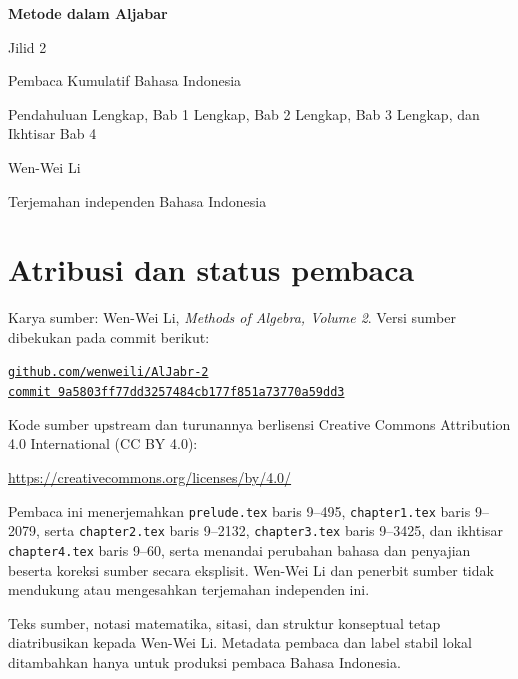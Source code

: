 \documentclass[
  colors=true,
  fontsetup=font-setup-id.tex,
  titlesetup=titles-setup.tex
]{AJbook2}
\theoremstyle{plain}
\theoremstyle{nonumberplain}
\numberwithin{equation}{section}
\numberwithin{figure}{section}
\begin{document}
\begin{titlepage}
  \centering
  \vspace*{0.16\textheight}
  {\Huge\bfseries Metode dalam Aljabar\par}
  \vspace{0.8em}
  {\LARGE Jilid 2\par}
  \vspace{1.8em}
  {\Large Pembaca Kumulatif Bahasa Indonesia\par}
  \vspace{0.6em}
  {\large Pendahuluan Lengkap, Bab 1 Lengkap, Bab 2 Lengkap, Bab 3 Lengkap, dan Ikhtisar Bab 4\par}
  \vfill
  {\Large Wen-Wei Li\par}
  \vspace{0.6em}
  {\normalsize Terjemahan independen Bahasa Indonesia\par}
  \vspace*{0.10\textheight}
\end{titlepage}

\cleardoublepage
\thispagestyle{empty}
\section*{Atribusi dan status pembaca}
Karya sumber: Wen-Wei Li, \emph{Methods of Algebra, Volume 2}. Versi
sumber dibekukan pada commit berikut:
\begin{center}
  \small
  \href{https://github.com/wenweili/AlJabr-2}{\texttt{github.com/wenweili/AlJabr-2}}\\
  \href{https://github.com/wenweili/AlJabr-2/commit/9a5803ff77dd3257484cb177f851a73770a59dd3}{\texttt{commit 9a5803ff77dd3257484cb177f851a73770a59dd3}}
\end{center}
Kode sumber upstream dan turunannya berlisensi Creative Commons
Attribution 4.0 International (CC BY 4.0):
\begin{center}
  \small\url{https://creativecommons.org/licenses/by/4.0/}
\end{center}
Pembaca ini menerjemahkan
\texttt{prelude.tex} baris 9--495, \texttt{chapter1.tex} baris 9--2079,
serta \texttt{chapter2.tex} baris 9--2132, \texttt{chapter3.tex} baris
9--3425, dan ikhtisar \texttt{chapter4.tex} baris 9--60, serta menandai
perubahan bahasa dan penyajian beserta koreksi sumber secara eksplisit.
Wen-Wei Li dan penerbit sumber tidak mendukung atau mengesahkan terjemahan
independen ini.

\medskip
Teks sumber, notasi matematika, sitasi, dan struktur konseptual tetap
diatribusikan kepada Wen-Wei Li. Metadata pembaca dan label stabil lokal
ditambahkan hanya untuk produksi pembaca Bahasa Indonesia.
\end{document}
